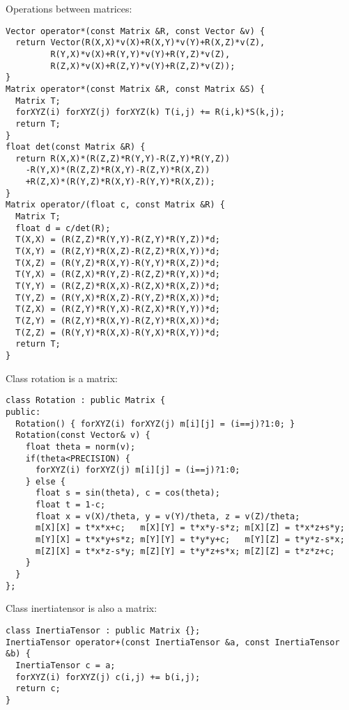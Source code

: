 Operations between matrices: \begin{lstlisting}
Vector operator*(const Matrix &R, const Vector &v) {
  return Vector(R(X,X)*v(X)+R(X,Y)*v(Y)+R(X,Z)*v(Z),
		 R(Y,X)*v(X)+R(Y,Y)*v(Y)+R(Y,Z)*v(Z),
		 R(Z,X)*v(X)+R(Z,Y)*v(Y)+R(Z,Z)*v(Z));
}
Matrix operator*(const Matrix &R, const Matrix &S) {
  Matrix T;
  forXYZ(i) forXYZ(j) forXYZ(k) T(i,j) += R(i,k)*S(k,j);
  return T;
}
float det(const Matrix &R) {
  return R(X,X)*(R(Z,Z)*R(Y,Y)-R(Z,Y)*R(Y,Z))
    -R(Y,X)*(R(Z,Z)*R(X,Y)-R(Z,Y)*R(X,Z))
    +R(Z,X)*(R(Y,Z)*R(X,Y)-R(Y,Y)*R(X,Z));
}
Matrix operator/(float c, const Matrix &R) {
  Matrix T;
  float d = c/det(R);
  T(X,X) = (R(Z,Z)*R(Y,Y)-R(Z,Y)*R(Y,Z))*d;
  T(X,Y) = (R(Z,Y)*R(X,Z)-R(Z,Z)*R(X,Y))*d;
  T(X,Z) = (R(Y,Z)*R(X,Y)-R(Y,Y)*R(X,Z))*d;
  T(Y,X) = (R(Z,X)*R(Y,Z)-R(Z,Z)*R(Y,X))*d;
  T(Y,Y) = (R(Z,Z)*R(X,X)-R(Z,X)*R(X,Z))*d;
  T(Y,Z) = (R(Y,X)*R(X,Z)-R(Y,Z)*R(X,X))*d;
  T(Z,X) = (R(Z,Y)*R(Y,X)-R(Z,X)*R(Y,Y))*d;
  T(Z,Y) = (R(Z,Y)*R(X,Y)-R(Z,Y)*R(X,X))*d;
  T(Z,Z) = (R(Y,Y)*R(X,X)-R(Y,X)*R(X,Y))*d;
  return T;
}
\end{lstlisting}
\noindent
Class rotation is a matrix: \begin{lstlisting}
class Rotation : public Matrix {
public:
  Rotation() { forXYZ(i) forXYZ(j) m[i][j] = (i==j)?1:0; }
  Rotation(const Vector& v) {
    float theta = norm(v);    
    if(theta<PRECISION) {
      forXYZ(i) forXYZ(j) m[i][j] = (i==j)?1:0;
    } else {
      float s = sin(theta), c = cos(theta);
      float t = 1-c;
      float x = v(X)/theta, y = v(Y)/theta, z = v(Z)/theta;
      m[X][X] = t*x*x+c;   m[X][Y] = t*x*y-s*z; m[X][Z] = t*x*z+s*y;
      m[Y][X] = t*x*y+s*z; m[Y][Y] = t*y*y+c;   m[Y][Z] = t*y*z-s*x;
      m[Z][X] = t*x*z-s*y; m[Z][Y] = t*y*z+s*x; m[Z][Z] = t*z*z+c;
    }
  }
};
\end{lstlisting}
\noindent
Class inertiatensor is also a matrix: \begin{lstlisting}
class InertiaTensor : public Matrix {};
InertiaTensor operator+(const InertiaTensor &a, const InertiaTensor &b) {
  InertiaTensor c = a;
  forXYZ(i) forXYZ(j) c(i,j) += b(i,j);
  return c;
}
\end{lstlisting}
\noindent
